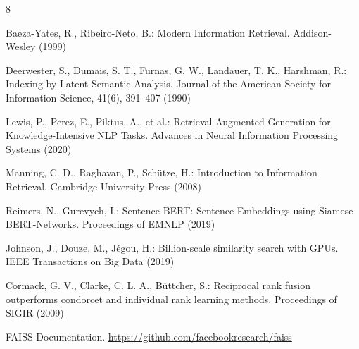 \documentclass{llncs}
\begin{document}
\begin{thebibliography}{8}

Baeza-Yates, R., Ribeiro-Neto, B.:
Modern Information Retrieval.
Addison-Wesley (1999)

Deerwester, S., Dumais, S. T., Furnas, G. W., Landauer, T. K., Harshman, R.:
Indexing by Latent Semantic Analysis.
Journal of the American Society for Information Science, 41(6), 391--407 (1990)

Lewis, P., Perez, E., Piktus, A., et al.:
Retrieval-Augmented Generation for Knowledge-Intensive NLP Tasks.
Advances in Neural Information Processing Systems (2020)

Manning, C. D., Raghavan, P., Sch\"utze, H.:
Introduction to Information Retrieval.
Cambridge University Press (2008)

Reimers, N., Gurevych, I.:
Sentence-BERT: Sentence Embeddings using Siamese BERT-Networks.
Proceedings of EMNLP (2019)

Johnson, J., Douze, M., J{\'e}gou, H.:
Billion-scale similarity search with GPUs.
IEEE Transactions on Big Data (2019)

Cormack, G. V., Clarke, C. L. A., B{\"u}ttcher, S.:
Reciprocal rank fusion outperforms condorcet and individual rank learning methods.
Proceedings of SIGIR (2009)

FAISS Documentation.
\url{https://github.com/facebookresearch/faiss}

\end{thebibliography}
\end{document}
